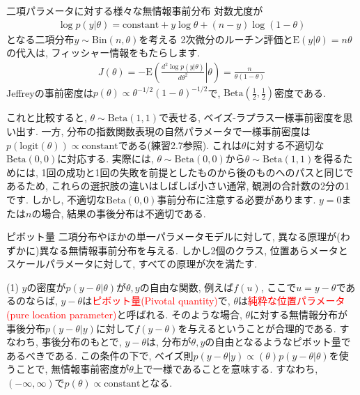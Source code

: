 \documentclass[10pt,dvipdfmx,a4]{beamer}
\newcommand{\eqn}[1]{\begin{align*}#1\end{align*}}
\newcommand{\tcr}[1]{\textcolor{red}{#1}}
\begin{document}
\begin{frame}{二項パラメータに対する様々な無情報事前分布}
対数尤度が
\eqn{\log p(y|\theta)=\text{constant}+y\log\theta+(n-y)\log (1-\theta)}
となる二項分布$y\sim \text{Bin}(n,\theta)$を考える
2次微分のルーチン評価と$\text{E}(y |\theta)=n\theta$の代入は, フィッシャー情報をもたらします.
\eqn{J(\theta)=-\text{E}\left(\left.\frac{d^2\log p(y|\theta)}{d\theta^2}\right|\theta\right)=\frac{n}{\theta(1-\theta)}}
Jeffreyの事前密度は$p(\theta)\propto\theta^{-1/2}(1-\theta)^{-1/2}$で, $\text{Beta}(\tfrac{1}{2},\tfrac{1}{2})$密度である.

これと比較すると, $\theta\sim\text{Beta}(1,1)$で表せる, ベイズ-ラプラス一様事前密度を思い出す.
一方, 分布の指数関数表現の自然パラメータで一様事前密度は$p(\text{logit}(\theta))\propto\text{constant}$である(練習2.7参照).
これは$\theta$に対する不適切な$\text{Beta}(0,0)$に対応する.
実際には, $\theta\sim\text{Beta}(0,0)$から$\theta\sim\text{Beta}(1,1)$を得るためには, 1回の成功と1回の失敗を前提としたものから後のものへのパスと同じであるため, これらの選択肢の違いはしばしば小さい通常, 観測の合計数の2分の1です.
しかし, 不適切な$\text{Beta}(0,0)$事前分布に注意する必要があります.
$y = 0$または$n$の場合, 結果の事後分布は不適切である.
\end{frame}


\begin{frame}{ピボット量}
二項分布やほかの単一パラメータモデルに対して, 異なる原理が(わずかに)異なる無情報事前分布を与える.
しかし2個のクラス, 位置あらメータとスケールパラメータに対して, すべての原理が次を満たす.

(1) $y$の密度が$p(y-\theta|\theta)$が$\theta, y$の自由な関数, 例えば$f(u)$, ここで$u=y-\theta$であるのならば, $y-\theta$は\tcr{ピボット量(Pivotal quantity)}で, $\theta$は\tcr{純粋な位置パラメータ(pure location parameter)}と呼ばれる.
そのような場合, $\theta$に対する無情報分布が事後分布$p(y-\theta|y)$に対して$f(y-\theta)$を与えるということが合理的である.
すなわち, 事後分布のもとで, $y-\theta$は, 分布が$\theta, y$の自由となるようなピボット量であるべきである.
この条件の下で, ベイズ則$p(y-\theta|y)\propto(\theta)p(y-\theta|\theta)$を使うことで, 無情報事前密度が$\theta$上で一様であることを意味する.
すなわち, $(-\infty,\infty)$で$p(\theta)\propto\text{constant}$となる.
\end{frame}

\end{document}
